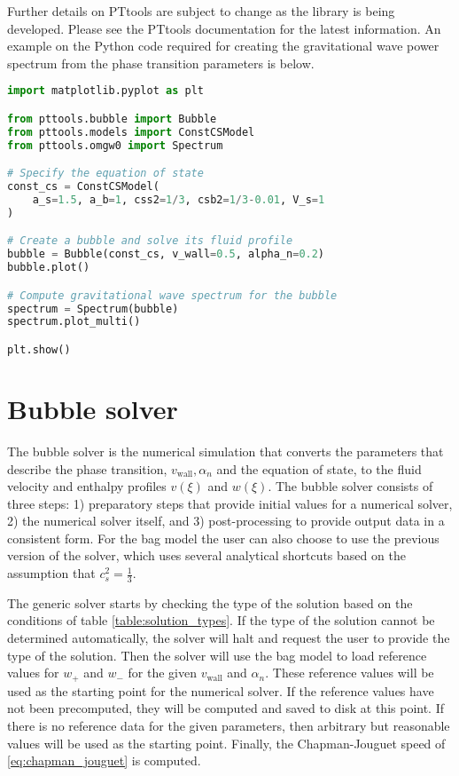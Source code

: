 Further details on PTtools are subject to change as the library is being developed.
Please see the PTtools documentation for the latest information.
An example on the Python code required for creating the gravitational wave power spectrum from the phase transition parameters is below.
\begin{lstlisting}[language=Python]
import matplotlib.pyplot as plt

from pttools.bubble import Bubble
from pttools.models import ConstCSModel
from pttools.omgw0 import Spectrum

# Specify the equation of state
const_cs = ConstCSModel(
    a_s=1.5, a_b=1, css2=1/3, csb2=1/3-0.01, V_s=1
)

# Create a bubble and solve its fluid profile
bubble = Bubble(const_cs, v_wall=0.5, alpha_n=0.2)
bubble.plot()

# Compute gravitational wave spectrum for the bubble
spectrum = Spectrum(bubble)
spectrum.plot_multi()

plt.show()
\end{lstlisting}


\section{Bubble solver}
The bubble solver is the numerical simulation that converts the parameters that describe the phase transition, $v_{\text{wall}}, \alpha_n$ and the equation of state, to the fluid velocity and enthalpy profiles $v(\xi)$ and $w(\xi)$.
The bubble solver consists of three steps:
1) preparatory steps that provide initial values for a numerical solver,
2) the numerical solver itself, and
3) post-processing to provide output data in a consistent form.
For the bag model the user can also choose to use the previous version of the solver,
which uses several analytical shortcuts based on the assumption that $c_s^2 = \frac{1}{3}$.

The generic solver starts by checking the type of the solution based on the conditions of table \ref{table:solution_types}.
If the type of the solution cannot be determined automatically, the solver will halt and request the user to provide the type of the solution.
Then the solver will use the bag model to load reference values for $w_+$ and $w_-$ for the given $v_\text{wall}$ and $\alpha_n$.
These reference values will be used as the starting point for the numerical solver.
If the reference values have not been precomputed,
they will be computed and saved to disk at this point.
If there is no reference data for the given parameters,
then arbitrary but reasonable values will be used as the starting point.
Finally, the Chapman-Jouguet speed of \eqref{eq:chapman_jouguet} is computed.


